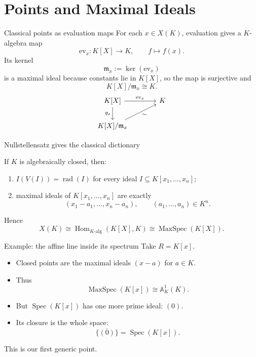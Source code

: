 \documentclass[10pt, aspectratio=169]{beamer}
\DeclareMathOperator{\Spec}{Spec}
\DeclareMathOperator{\MaxSpec}{MaxSpec}
\DeclareMathOperator{\Hom}{Hom}
\DeclareMathOperator{\rad}{rad}
\newcommand{\A}{\mathbb{A}}
\begin{document}
\section{Points and Maximal Ideals}

\begin{frame}[fragile]{Classical points as evaluation maps}
    For each $x \in X(K)$, evaluation gives a $K$-algebra map
    \[
    \mathrm{ev}_x : K[X] \longrightarrow K,
    \qquad f \longmapsto f(x).
    \]
    Its kernel
    \[
    \mathfrak m_x := \ker(\mathrm{ev}_x)
    \]
    is a maximal ideal because constants lie in $K[X]$, so the map is surjective and
    \[
    K[X]/\mathfrak m_x \cong K.
    \]
    \vspace{-0.3em}
    \[
    \begin{tikzcd}[column sep=large]
        K[X] \arrow[r, "\mathrm{ev}_x"] \arrow[d, "q_x"'] & K \\
        K[X]/\mathfrak m_x \arrow[ur, "\sim"'] &
    \end{tikzcd}
    \]
\end{frame}

\begin{frame}{Nullstellensatz gives the classical dictionary}
    \begin{theorem}
        If $K$ is algebraically closed, then:
        \begin{enumerate}
            \item $I(V(I)) = \rad(I)$ for every ideal $I \subseteq K[x_1,\dots,x_n]$;
            \item maximal ideals of $K[x_1,\dots,x_n]$ are exactly
            \[
            (x_1-a_1,\dots,x_n-a_n), \qquad (a_1,\dots,a_n) \in K^n.
            \]
        \end{enumerate}
    \end{theorem}
    Hence
    \[
    \boxed{X(K) \cong \Hom_{K\text{-alg}}(K[X], K) \cong \MaxSpec(K[X]).}
    \]
\end{frame}

\begin{frame}{Example: the affine line inside its spectrum}
    Take $R = K[x]$.
    \begin{itemize}
        \item Closed points are the maximal ideals $(x-a)$ for $a \in K$.
        \item Thus
        \[
        \MaxSpec(K[x]) \cong \A_K^1(K).
        \]
        \item But $\Spec(K[x])$ has one more prime ideal: $(0)$.
        \item Its closure is the whole space:
        \[
        \overline{\{(0)\}} = \Spec(K[x]).
        \]
    \end{itemize}
    This is our first generic point.
\end{frame}
\end{document}
